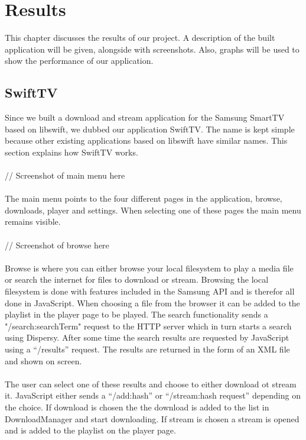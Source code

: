 \chapter{Results}
This chapter discusses the results of our project. A description of the built application will be given, alongside with screenshots.
Also, graphs will be used to show the performance of our application.

\section{SwiftTV}
Since we built a download and stream application for the Samsung SmartTV based on libswift, we dubbed our application SwiftTV.
The name is kept simple because other existing applications based on libswift have similar names. This section explains how SwiftTV works.
\\\\
// Screenshot of main menu here
\\\\
The main menu points to the four different pages in the application, browse, downloads, player and settings. When selecting one of these pages the main menu remains visible.
\\\\
// Screenshot of browse here
\\\\
Browse is where you can either browse your local filesystem to play a media file or search the internet for files to download or stream. Browsing the local filesystem is done with features included in the Samsung API and is therefor all done in JavaScript. When choosing a file from the browser it can be added to the playlist in the player page to be played. The search functionality sends a "/search:searchTerm" request to the HTTP server which in turn starts a search using Dispersy. After some time the search results are requested by JavaScript using a ``/results'' request. The results are returned in the form of an XML file and shown on screen. 
\\\\
The user can select one of these results and choose to either download ot stream it. JavaScript either sends a ``/add:hash'' or ``/stream:hash request'' depending on the choice. If download is chosen the the download is added to the list in DownloadManager and start downloading. If stream is chosen a stream is opened and is added to the playlist on the player page.
\\\\
